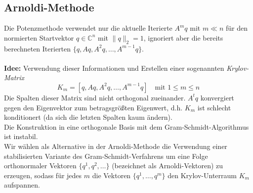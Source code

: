 \subsection{Arnoldi-Methode}
Die Potenzmethode verwendet nur die aktuelle Iterierte $A^mq$ mit $m\ll n$ für den normierten Startvektor 
$q\in\mathbb{C}^n$ mit $\|q\|_2=1$, ignoriert aber die bereits berechneten Iterierten $\{q,Aq,A^2q,\dotsc,A^{m-1}q\}$. \\ \\
\textbf{Idee:} Verwendung dieser Informationen und Erstellen einer sogenannten \textit{Krylov-Matrix}
\[K_m = [q,Aq,A^2q,\dotsc,A^{m-1}q]\quad\text{mit }1\leq m\leq n\]
Die Spalten dieser Matrix sind nicht orthogonal zueinander. $A^tq$ konvergiert gegen den Eigenvektor zum betragsgrößten
Eigenwert, d.h. $K_m$ ist schlecht konditionert (da sich die letzten Spalten kaum ändern). \\
Die Konstruktion in eine orthogonale Basis mit dem Gram-Schmidt-Algorithmus ist instabil. \\
Wir wählen als Alternative in der Arnoldi-Methode die Verwendung einer stabilisierten Variante des 
Gram-Schmidt-Verfahrens um eine Folge orthonormaler Vektoren $\{q^1,q^2,\dotsc\}$ (bezeichnet als 
Arnoldi-Vektoren) zu erzeugen, sodass für jedes $m$ die Vektoren $\{q^1,\dotsc,q^m\}$ den Krylov-Unterraum $K_m$ 
aufspannen.